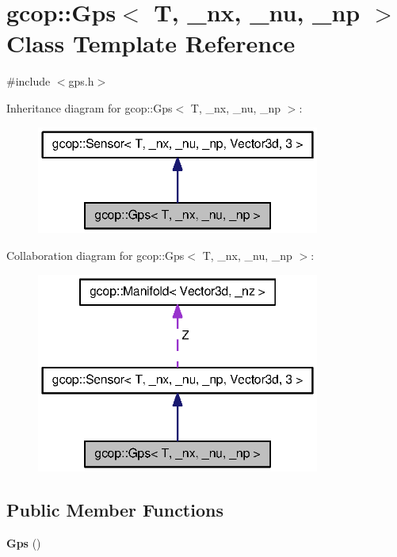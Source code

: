 \section{gcop\-:\-:\-Gps$<$ \-T, \-\_\-nx, \-\_\-nu, \-\_\-np $>$ \-Class \-Template \-Reference}
\label{classgcop_1_1Gps}


{\ttfamily \#include $<$gps.\-h$>$}



\-Inheritance diagram for gcop\-:\-:\-Gps$<$ \-T, \-\_\-nx, \-\_\-nu, \-\_\-np $>$\-:
\nopagebreak
\begin{figure}[H]
\begin{center}
\leavevmode
\includegraphics[width=264pt]{classgcop_1_1Gps__inherit__graph}
\end{center}
\end{figure}


\-Collaboration diagram for gcop\-:\-:\-Gps$<$ \-T, \-\_\-nx, \-\_\-nu, \-\_\-np $>$\-:
\nopagebreak
\begin{figure}[H]
\begin{center}
\leavevmode
\includegraphics[width=264pt]{classgcop_1_1Gps__coll__graph}
\end{center}
\end{figure}
\subsection*{\-Public \-Member \-Functions}
\begin{DoxyCompactItemize}
\item 
{\bf \-Gps} ()
\end{DoxyCompactItemize}



